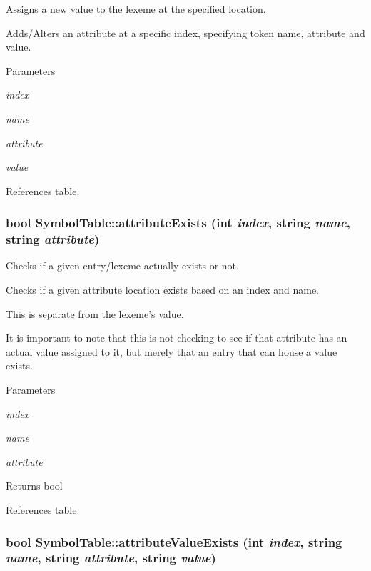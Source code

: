 Assigns a new value to the lexeme at the specified location. 

Adds/Alters an attribute at a specific index, specifying token name, attribute and value.


\begin{DoxyParams}{Parameters}
\item[{\em index}]\item[{\em name}]\item[{\em attribute}]\item[{\em value}]\end{DoxyParams}


References table.

\hypertarget{classSymbolTable_af93b3c97308b5cfe7661e57b83d8dc35}{
\subsubsection[{attributeExists}]{\setlength{\rightskip}{0pt plus 5cm}bool SymbolTable::attributeExists (int {\em index}, \/  string {\em name}, \/  string {\em attribute})}}
\label{classSymbolTable_af93b3c97308b5cfe7661e57b83d8dc35}


Checks if a given entry/lexeme actually exists or not. 

Checks if a given attribute location exists based on an index and name.

This is separate from the lexeme's value.

It is important to note that this is not checking to see if that attribute has an actual value assigned to it, but merely that an entry that can house a value exists. 
\begin{DoxyParams}{Parameters}
\item[{\em index}]\item[{\em name}]\item[{\em attribute}]\end{DoxyParams}
\begin{DoxyReturn}{Returns}
bool 
\end{DoxyReturn}


References table.

\hypertarget{classSymbolTable_a7df0fef90bee097810b553ad2e1c6cec}{
\subsubsection[{attributeValueExists}]{\setlength{\rightskip}{0pt plus 5cm}bool SymbolTable::attributeValueExists (int {\em index}, \/  string {\em name}, \/  string {\em attribute}, \/  string {\em value})}}
\label{classSymbolTable_a7df0fef90bee097810b553ad2e1c6cec}


